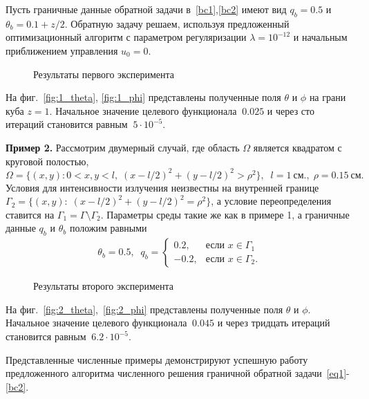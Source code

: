 Пусть граничные данные обратной задачи в~\eqref{bc1},\eqref{bc2} имеют вид $q_b = 0.5$ и $\theta_b=0.1 + z/2 $.
Обратную задачу решаем, используя предложенный оптимизационный алгоритм с параметром регуляризации
$\lambda=10^{-12}$ и начальным приближением управления $u_0 = 0$.
\begin{figure}
    \centering
    \caption{Результаты первого эксперимента}
    \label{fig:1}
\end{figure}

На фиг.~\ref{fig:1_theta}, \ref{fig:1_phi} представлены полученные поля $\theta$ и $\phi$ на грани куба $z=1$.
Начальное значение целевого функционала $~0.025$ и
через сто итераций становится равным $~5\cdot 10^{-5}$.

\textbf{Пример 2.}
Рассмотрим двумерный случай, где область $\Omega$ является квадратом с круговой полостью,
\[
    \Omega=\{(x, y): 0< x,y< l,\; (x-l/2)^2+(y-l/2)^2>\rho^2\},\;\; l=1~\text{см.},
    \;\rho=0.15~\text{см.}
\]
Условия для интенсивности излучения неизвестны на внутренней границе $\Gamma_2=\{(x, y): \; (x-l/2)^2+(y-l/2)^2=\rho^2\}$,
а условие переопределения ставится на $\Gamma_1=\Gamma\setminus \Gamma_2.$
Параметры среды такие же как в примере 1, а
граничные данные $q_b$ и $\theta_b$ положим равными
\begin{gather*}
    \theta_b = 0.5, \;\;
    q_b =
    \begin{cases}
        0.2, & \text{если } x \in \Gamma_1 \\
        -0.2, & \text{если } x \in \Gamma_2.
    \end{cases}
\end{gather*}
\begin{figure}
    \centering
    \caption{Результаты второго эксперимента}
    \label{fig:2}
\end{figure}
На фиг.~\ref{fig:2_theta},~\ref{fig:2_phi} представлены полученные поля $\theta$ и $\phi$.
Начальное значение целевого функционала $~0.045$ и
через тридцать итераций становится равным $~6.2\cdot 10^{-5}$.

Представленные численные примеры демонстрируют успешную работу предложенного алгоритма
численного решения граничной обратной задачи~\eqref{eq1}-\eqref{bc2}.
